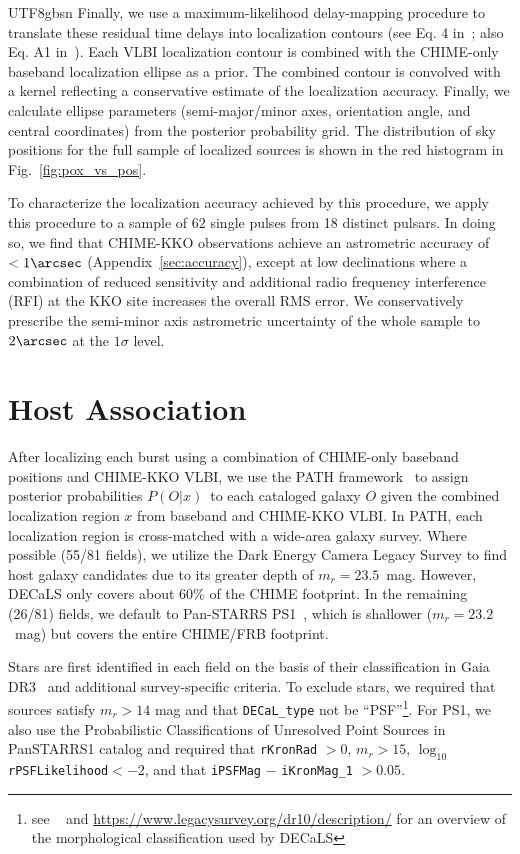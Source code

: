 \documentclass[twocolumn,linenumbers]{aastex631}
\newcommand{\pox}{\ensuremath{P(O|x)}}
\begin{document}
\begin{CJK*}{UTF8}{gbsn}
Finally, we use a maximum-likelihood delay-mapping procedure to translate these residual time delays into localization contours (see Eq. 4 in~\citet{marcote2020repeating}; also Eq. A1 in~\citet{leung2024vlbi}). Each VLBI localization contour is combined with the CHIME-only baseband localization ellipse as a prior. The combined contour is convolved with a kernel reflecting a conservative estimate of the localization accuracy. Finally, we calculate ellipse parameters (semi-major/minor axes, orientation angle, and central coordinates) from the posterior probability grid. The distribution of sky positions for the full sample of localized sources is shown in the red histogram in Fig.~\ref{fig:pox_vs_pos}.

To characterize the localization accuracy achieved by this procedure, we apply this procedure to a sample of $62$ single pulses from 18 distinct pulsars. In doing so, we find that CHIME-KKO observations achieve an astrometric accuracy of $< 1\arcsec$ (Appendix~\ref{sec:accuracy}), except at low declinations where a combination of reduced sensitivity and additional radio frequency interference (RFI) at the KKO site increases the overall RMS error. We conservatively prescribe the semi-minor axis astrometric uncertainty of the whole sample to $2\arcsec$ at the $1\sigma$ level. 

\section{Host Association}\label{sec:association}
After localizing each burst using a combination of CHIME-only baseband positions and CHIME-KKO VLBI, we use the PATH framework~\citep{aggarwal2021probabilistic} to assign posterior probabilities \pox\ to each cataloged galaxy $O$ given the combined localization region $x$ from baseband and CHIME-KKO VLBI. In PATH, each localization region is cross-matched with a wide-area galaxy survey. Where possible (55/81 fields), we utilize the Dark Energy Camera Legacy Survey \citep[DECaLS;][]{dey2019overview} to find host galaxy candidates
due to its greater depth of $m_r = 23.5$~mag. However, DECaLS only covers about $60\%$ of the CHIME footprint. In the remaining  (26/81) fields, we default to Pan-STARRS PS1~\citep{chambers2016pan, flewelling2020pan,magnier2020pan,magnier2020pan2, magnier2020pan3,waters2020pan}, which is shallower ($m_r = 23.2$~mag) but covers the entire CHIME/FRB footprint.

Stars are first identified in each field on the basis of their classification in Gaia DR3~\citep{gaia2016gaia, gaia2023gaia} and additional 
survey-specific criteria. To exclude stars, we required that sources satisfy
$m_r > 14$ mag and that \texttt{DECaL\_type} not be ``PSF''\footnote{see ~\citet{dey2019overview} and \url{https://www.legacysurvey.org/dr10/description/} for an overview of the morphological classification used by DECaLS}. For PS1, we also use the
Probabilistic Classifications of Unresolved Point Sources in PanSTARRS1 catalog 
\citep[PS1-PSC;][]{tachibana2018} and required that
\texttt{rKronRad} $ > 0$, $m_r > 15$, $\log_{10}$\texttt{rPSFLikelihood}$ < -2$, and that \texttt{iPSFMag} $-$ \texttt{iKronMag\_1} $> 0.05$.


\end{CJK*}
\end{document}
